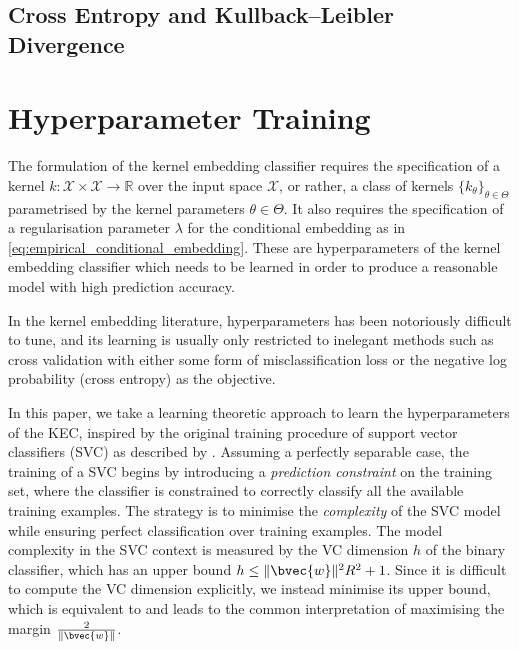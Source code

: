 \documentclass{article}
\begin{document}
	\subsection{Cross Entropy and Kullback–Leibler Divergence}

\section{Hyperparameter Training}
\label{sec:hyperparameter_learning}

	The formulation of the kernel embedding classifier requires the specification of a kernel $k : \mathcal{X} \times \mathcal{X} \to \mathbb{R}$ over the input space $\mathcal{X}$, or rather, a class of kernels $\{k_{\theta}\}_{\theta \in \Theta}$ parametrised by the kernel parameters $\theta \in \Theta$. It also requires the specification of a regularisation parameter $\lambda$ for the conditional embedding as in \eqref{eq:empirical_conditional_embedding}. These are hyperparameters of the kernel embedding classifier which needs to be learned in order to produce a reasonable model with high prediction accuracy. 

	In the kernel embedding literature, hyperparameters has been notoriously difficult to tune, and its learning is usually only restricted to inelegant methods such as cross validation with either some form of misclassification loss or the negative log probability (cross entropy) as the objective.


	In this paper, we take a learning theoretic approach to learn the hyperparameters of the KEC, inspired by the original training procedure of support vector classifiers (SVC) as described by \cite[p. 185]{m2001introduction}. Assuming a perfectly separable case, the training of a SVC begins by introducing a \textit{prediction constraint} on the training set, where the classifier is constrained to correctly classify all the available training examples. The strategy is to minimise the \textit{complexity} of the SVC model while ensuring perfect classification over training examples. The model complexity in the SVC context is measured by the VC dimension $h$ of the binary classifier, which has an upper bound $h \leq \lVert \bvec{w} \rVert^{2} R^{2} + 1$. Since it is difficult to compute the VC dimension explicitly, we instead minimise its upper bound, which is equivalent to and leads to the common interpretation of maximising the margin $\frac{2}{\lVert \bvec{w} \rVert}$.
	
\end{document}
